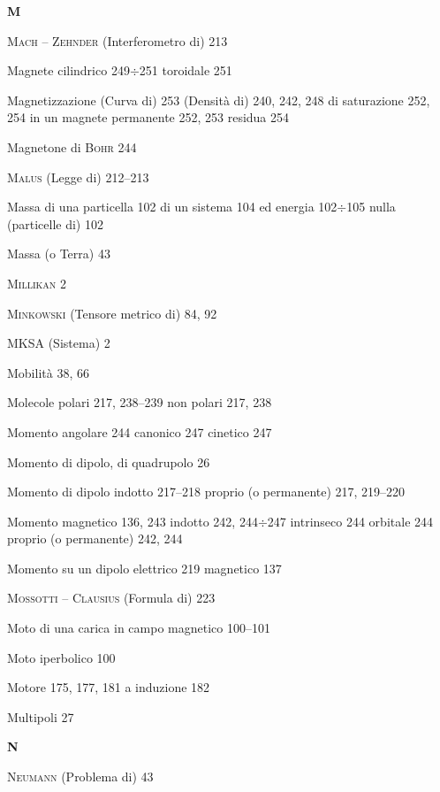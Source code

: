 \begin{theindex}
  \indexspace
  \item \textbf{M}
  \indexspace
  \item \textsc{Mach} -- \textsc{Zehnder} (Interferometro di) 213
  \item Magnete cilindrico 249$\div$251
    \subitem toroidale 251
  \item Magnetizzazione (Curva di) 253
    \subitem (Densit\`a di) 240, 242, 248
    \subitem di saturazione 252, 254
    \subitem in un magnete permanente 252, 253
    \subitem residua 254
  \item Magnetone di \textsc{Bohr} 244
  \item \textsc{Malus} (Legge di) 212--213
  \item Massa di una particella 102
    \subitem di un sistema 104
    \subitem ed energia 102$\div$105
    \subitem nulla (particelle di) 102
  \item Massa (o Terra) 43
  \item \textsc{Millikan} 2
  \item \textsc{Minkowski} (Tensore metrico di) 84, 92
  \item MKSA (Sistema) 2
  \item Mobilit\`a 38, 66
  \item Molecole polari 217, 238--239
    \subitem non polari 217, 238
  \item Momento angolare 244
    \subitem canonico 247
    \subitem cinetico 247
  \item Momento di dipolo, di quadrupolo 26
  \item Momento di dipolo indotto 217--218
    \subitem proprio (o permanente) 217, 219--220
  \item Momento magnetico 136, 243
    \subitem indotto 242, 244$\div$247
    \subitem intrinseco 244
    \subitem orbitale 244
    \subitem proprio (o permanente) 242, 244
  \item Momento su un dipolo
    \subitem elettrico 219
    \subitem magnetico 137
  \item \textsc{Mossotti} -- \textsc{Clausius} (Formula di) 223
  \item Moto di una carica in campo magnetico 100--101
  \item Moto iperbolico 100
  \item Motore 175, 177, 181
    \subitem a induzione 182
  \item Multipoli 27

  \indexspace
  \item \textbf{N}
  \indexspace
  \item \textsc{Neumann} (Problema di) 43


\end{theindex}
